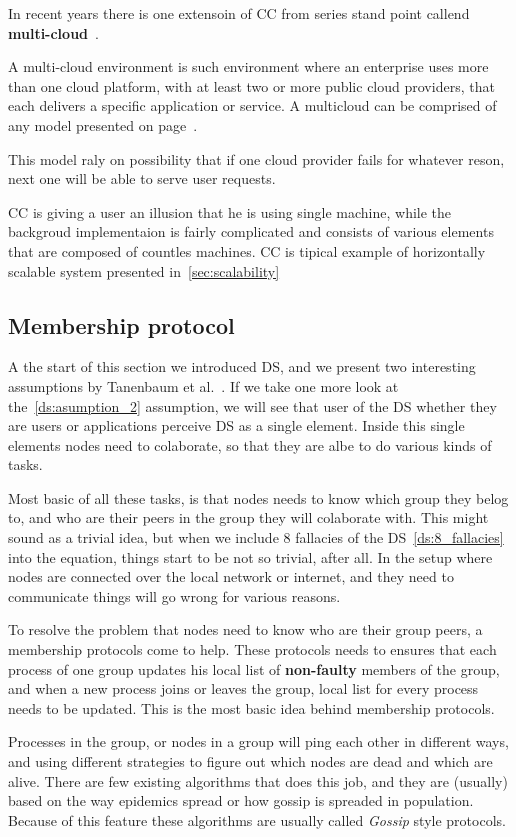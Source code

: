 In recent years there is one extensoin of CC from series stand point callend \textbf{multi-cloud}~\cite{HongDSH19, Ardagna15}. 

A multi-cloud environment is such environment where an enterprise uses more than one cloud platform, with at least two or more public cloud providers, that each delivers a specific application or service. A multicloud can be comprised of any model presented on page~\pageref{sec_types}.

This model raly on possibility that if one cloud provider fails for whatever reson, next one will be able to serve user requests.

CC is giving a user an illusion that he is using single machine, while the backgroud implementaion is fairly complicated and consists of various elements that are composed of countles machines. CC is tipical example of horizontally scalable system presented in~\ref{sec:scalability}
%
%
\subsection{Membership protocol}\label{sec:memership_protocol}
%
A the start of this section we introduced DS, and we present two interesting assumptions by Tanenbaum et al.~\cite{SteenT16, 0019513}. If we take one more look at the~\ref{ds:asumption_2} assumption, we will see that user of the DS whether they are users or applications perceive DS as a single element. Inside this single elements nodes need to colaborate, so that they are albe to do various kinds of tasks.

Most basic of all these tasks, is that nodes needs to know which group they belog to, and who are their peers in the group they will colaborate with. This might sound as a trivial idea, but when we include 8 fallacies of the DS~\ref{ds:8_fallacies} into the equation, things start to be not so trivial, after all. In the setup where nodes are connected over the local network or internet, and they need to communicate things will go wrong for various reasons.

To resolve the problem that nodes need to know who are their group peers, a membership protocols come to help. These protocols needs to ensures that each process of one group updates his local list of \textbf{non-faulty} members of the group, and when a new process joins or leaves the group, local list for every process needs to be updated. This is the most basic idea behind membership protocols.

Processes in the group, or nodes in a group will ping each other in different ways, and using different strategies to figure out which nodes are dead and which are alive. There are few existing algorithms that does this job, and they are (usually) based on the way epidemics spread or how gossip is spreaded in population. Because of this feature these algorithms are usually called \textit{Gossip} style protocols.

